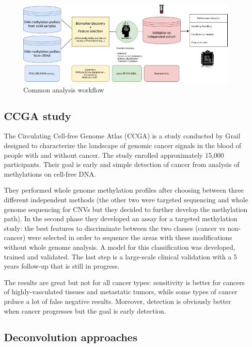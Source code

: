 \begin{figure}[!ht]
\centering
    \includegraphics[width=0.8\linewidth]{workflow.png}
    \caption{\label{fig:wo}Common analysis workflow}
\end{figure}

\subsection{CCGA study}

The Circulating Cell-free Genome Atlas (CCGA) is a study conducted by Grail
designed to characterize the landscape of genomic cancer signals in the blood of
people with and without cancer. The study enrolled approximately 15,000
participants. Their goal is early and simple detection of cancer from analysis
of methylations on cell-free DNA.

They performed whole genome methylation profiles after choosing between three
different independent methods (the other two were targeted sequencing and whole
genome sequencing for CNVs but they decided to further develop the methylation
path). In the second phase they developed an assay for a targeted methylation
study: the best features to discriminate between the two classes (cancer vs
non-cancer) were selected in order to sequence the areas with these
modifications without whole genome analysis. A model for this classification was
developed, trained and validated. The last step is a large-scale clinical
validation with a 5 years follow-up that is still in progress.

The results are great but not for all cancer types: sensitivity is better for
cancers of highly-vasculated tissues and metastatic tumors, while some types of
cancer prduce a lot of false negative results. Moreover, detection is obviously
better when cancer progresses but the goal is early detection.


\subsection{Deconvolution approaches}

